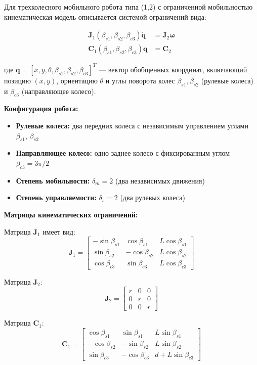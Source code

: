 Для трехколесного мобильного робота типа (1,2) с ограниченной мобильностью кинематическая модель описывается системой ограничений вида:

\begin{align}
\mathbf{J}_1(\beta_{s1}, \beta_{s2}, \beta_{c3}) \dot{\mathbf{q}} &= \mathbf{J}_2 \boldsymbol{\omega} \\
\mathbf{C}_1(\beta_{s1}, \beta_{s2}, \beta_{c3}) \dot{\mathbf{q}} &= \mathbf{C}_2
\end{align}

где $\mathbf{q} = [x, y, \theta, \beta_{s1}, \beta_{s2}, \beta_{c3}]^T$ --- вектор обобщенных координат, включающий позицию $(x, y)$, ориентацию $\theta$ и углы поворота колес $\beta_{s1}, \beta_{s2}$ (рулевые колеса) и $\beta_{c3}$ (направляющее колесо).

\textbf{Конфигурация робота:}
\begin{itemize}
\item \textbf{Рулевые колеса:} два передних колеса с независимым управлением углами $\beta_{s1}$, $\beta_{s2}$
\item \textbf{Направляющее колесо:} одно заднее колесо с фиксированным углом $\beta_{c3} = 3\pi/2$
\item \textbf{Степень мобильности:} $\delta_m = 2$ (два независимых движения)
\item \textbf{Степень управляемости:} $\delta_s = 2$ (два рулевых колеса)
\end{itemize}

\textbf{Матрицы кинематических ограничений:}

Матрица $\mathbf{J}_1$ имеет вид:
$$\mathbf{J}_1 = \begin{bmatrix}
-\sin\beta_{s1} & \cos\beta_{s1} & L\cos\beta_{s1} \\
\sin\beta_{s2} & -\cos\beta_{s2} & L\cos\beta_{s2} \\
\cos\beta_{c3} & \sin\beta_{c3} & L\cos\beta_{c3}
\end{bmatrix}$$

Матрица $\mathbf{J}_2$:
$$\mathbf{J}_2 = \begin{bmatrix}
r & 0 & 0 \\
0 & r & 0 \\
0 & 0 & r
\end{bmatrix}$$

Матрица $\mathbf{C}_1$:
$$\mathbf{C}_1 = \begin{bmatrix}
\cos\beta_{s1} & \sin\beta_{s1} & L\sin\beta_{s1} \\
-\cos\beta_{s2} & -\sin\beta_{s2} & L\sin\beta_{s2} \\
\sin\beta_{c3} & -\cos\beta_{c3} & d + L\sin\beta_{c3}
\end{bmatrix}$$

